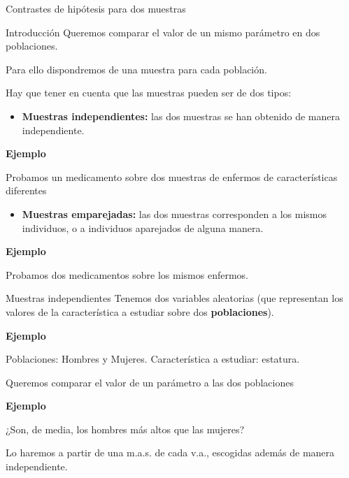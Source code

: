 \documentclass[
  ignorenonframetext,
]{beamer}
\providecommand{\tightlist}{%
  \setlength{\itemsep}{0pt}\setlength{\parskip}{0pt}}
\begin{document}
\begin{frame}{Contrastes de hipótesis para dos muestras}
\protect\hypertarget{contrastes-de-hipuxf3tesis-para-dos-muestras}{}
\end{frame}

\begin{frame}{Introducción}
\protect\hypertarget{introducciuxf3n}{}
Queremos comparar el valor de un mismo parámetro en dos poblaciones.

Para ello dispondremos de una muestra para cada población.

Hay que tener en cuenta que las muestras pueden ser de dos tipos:

\begin{itemize}[<+->]
\tightlist
\item
  \textbf{Muestras independientes:} las dos muestras se han obtenido de
  manera independiente.
\end{itemize}

\textbf{Ejemplo}

Probamos un medicamento sobre dos muestras de enfermos de
características diferentes

\begin{itemize}[<+->]
\tightlist
\item
  \textbf{Muestras emparejadas:} las dos muestras corresponden a los
  mismos individuos, o a individuos aparejados de alguna manera.
\end{itemize}

\textbf{Ejemplo}

Probamos dos medicamentos sobre los mismos enfermos.
\end{frame}

\begin{frame}{Muestras independientes}
\protect\hypertarget{muestras-independientes}{}
Tenemos dos variables aleatorias (que representan los valores de la
característica a estudiar sobre dos \textbf{poblaciones}).

\textbf{Ejemplo}

Poblaciones: Hombres y Mujeres. Característica a estudiar: estatura.

Queremos comparar el valor de un parámetro a las dos poblaciones

\textbf{Ejemplo}

¿Son, de media, los hombres más altos que las mujeres?

Lo haremos a partir de una m.a.s. de cada v.a., escogidas además de
manera independiente.
\end{frame}
\end{document}
